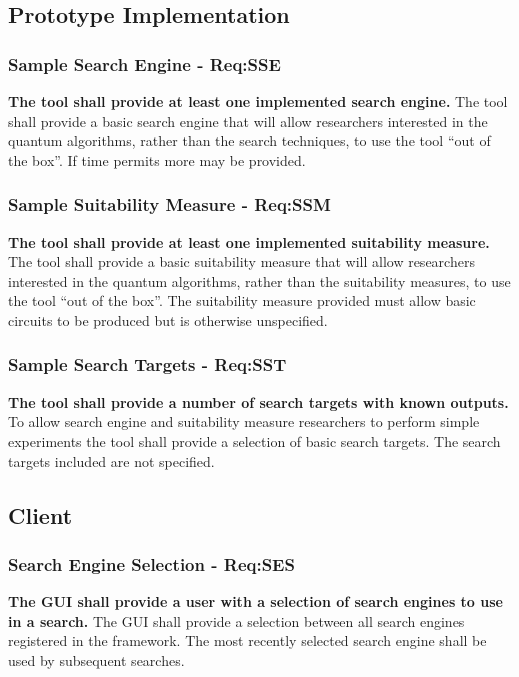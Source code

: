 \subsection{Prototype Implementation}
\subsubsection{Sample Search Engine - Req:SSE}
\label{sec:reqsse}
\textbf{The tool shall provide at least one implemented search engine.}
The tool shall provide a basic search engine that will allow researchers interested in the quantum algorithms, rather than the search techniques, to use the tool ``out of the box''.
If time permits more may be provided.

\subsubsection{Sample Suitability Measure - Req:SSM}
\label{sec:reqssm}
\textbf{The tool shall provide at least one implemented suitability measure.}
The tool shall provide a basic suitability measure that will allow researchers interested in the quantum algorithms, rather than the suitability measures, to use the tool ``out of the box''.
The suitability measure provided must allow basic circuits to be produced but is otherwise unspecified.

\subsubsection{Sample Search Targets - Req:SST}
\label{sec:reqsst}
\textbf{The tool shall provide a number of search targets with known outputs.}
To allow search engine and suitability measure researchers to perform simple experiments the tool shall provide a selection of basic search targets.
The search targets included are not specified.

\subsection{Client}
\label{sec:clientguireqs}

\subsubsection{Search Engine Selection - Req:SES}
\label{sec:reqses}
\textbf{The GUI shall provide a user with a selection of search engines to use in a search.}
The GUI shall provide a selection between all search engines registered in the framework.
The most recently selected search engine shall be used by subsequent searches.

